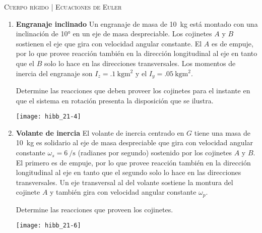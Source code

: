 \documentclass[11pt, spanish, a4paper, twoside]{article}
\begin{document}
\begin{center}
  \textsc{\large Cuerpo rígido | Ecuaciones de Euler}
\end{center}


\begin{enumerate}

	\item 
	\begin{minipage}[t][5cm]{0.55\textwidth}
		\textbf{Engranaje inclinado}
		Un engranaje de masa de \SI{10}{\kilo\gram} está montado con una inclinación de \ang{10;;} en un eje de masa despreciable.
		Los cojinetes \(A\) y \(B\) sostienen el eje que gira con velocidad angular constante.
		El \(A\) es de empuje, por lo que provee reacción también en la dirección longitudinal al eje en tanto que el \(B\) solo lo hace en las direcciones transversales.
		Los momentos de inercia del engranaje son \(I_z = \SI{.1}{\kilo\gram\metre\squared}\) y el \(I_y = \SI{.05}{\kilo\gram\metre\squared}\).
		\begin{tasks} 
			\task Determine las reacciones que deben proveer los cojinetes para el instante en que el sistema en rotación presenta la disposición que se ilustra.
		\end{tasks}
	\end{minipage}
	\begin{minipage}[c][0.5cm][t]{0.4\textwidth}
		\texttt{[image: hibb\_21-4]}
	\end{minipage}


	\item 
	\begin{minipage}[t][4.6cm]{0.55\textwidth}
		\textbf{Volante de inercia}
		El volante de inercia centrado en \(G\) tiene una masa de \SI{10}{\kilo\gram} es solidario al eje de masa despreciable que gira con velocidad angular constante \(\omega_s= \SI{6}{\per\second} \) (radianes por segundo) sostenido por los cojinetes \(A\) y \(B\).
		El primero es de empuje, por lo que provee reacción también en la dirección longitudinal al eje en tanto que el segundo solo lo hace en las direcciones transversales.
		Un eje transversal al del volante sostiene la montura del cojinete \(A\) y también gira con velocidad angular constante \(\omega_p\).
		\begin{tasks}
			\task Determine las reacciones que proveen los cojinetes.
		\end{tasks}
	\end{minipage}
	\begin{minipage}[c][0.5cm][t]{0.4\textwidth}
		\texttt{[image: hibb\_21-6]}
	\end{minipage}



\end{enumerate}
\end{document}
